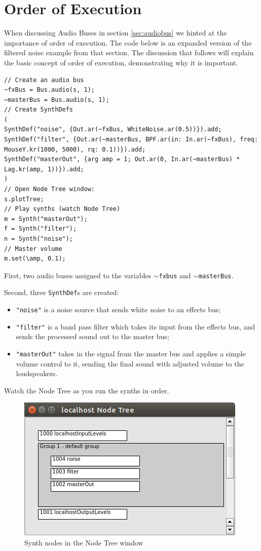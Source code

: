 \section{Order of Execution}
\label{sec:order-of-execution}

When discussing Audio Buses in section \ref{sec:audiobus} we hinted at the importance of order of execution. The code below is an expanded version of the filtered noise example from that section. The discussion that follows will explain the basic concept of order of execution, demonstrating why it is important.

\begin{lstlisting}[style=SuperCollider-IDE, basicstyle=\scttfamily\footnotesize]
// Create an audio bus
~fxBus = Bus.audio(s, 1);
~masterBus = Bus.audio(s, 1);
// Create SynthDefs
(
SynthDef("noise", {Out.ar(~fxBus, WhiteNoise.ar(0.5))}).add;
SynthDef("filter", {Out.ar(~masterBus, BPF.ar(in: In.ar(~fxBus), freq: MouseY.kr(1000, 5000), rq: 0.1))}).add;
SynthDef("masterOut", {arg amp = 1; Out.ar(0, In.ar(~masterBus) * Lag.kr(amp, 1))}).add;
)
// Open Node Tree window:
s.plotTree;
// Play synths (watch Node Tree)
m = Synth("masterOut");
f = Synth("filter");
n = Synth("noise");
// Master volume
m.set(\amp, 0.1);
\end{lstlisting}

First, two audio buses assigned to the variables \texttt{$\sim$fxbus} and \texttt{$\sim$masterBus}.

Second, three \texttt{SynthDef}s are created:
\begin{itemize}
\item \texttt{"noise"} is a noise source that sends white noise to an effects bus;
\item \texttt{"filter"} is a band pass filter which takes its input from the effects bus, and sends the processed sound out to the master bus;
\item \texttt{"masterOut"} takes in the signal from the master bus and applies a simple volume control to it, sending the final sound with adjusted volume to the loudspeakers.
\end{itemize}

Watch the Node Tree as you run the synths in order.

\begin{figure}[h]
\centerline{
	\includegraphics[scale=0.5]{fig-node-tree.png}}
\caption{Synth nodes in the Node Tree window}
\label{fig:node-tree}
\end{figure}

